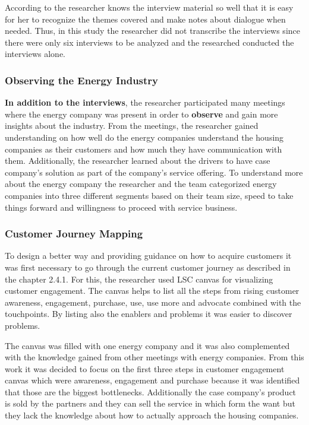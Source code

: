 According to \textcite{HH:2001} the researcher knows the interview material so well that it is easy for her to recognize the themes covered and make notes about dialogue when needed. Thus, in this study the researcher did not transcribe the interviews since there were only six interviews to be analyzed and the researched conducted the interviews alone.

\subsubsection*{Observing the Energy Industry}

\textbf{In addition to the interviews}, the researcher participated many meetings where the energy company was present in order to \textbf{observe} and gain more insights about the industry. From the meetings, the researcher gained understanding on how well do the energy companies understand the housing companies as their customers and how much they have communication with them. Additionally, the researcher learned about the drivers to have case company's solution as part of the company's service offering. To understand more about the energy company the researcher and the team categorized energy companies into three different segments based on their team size, speed to take things forward and willingness to proceed with service business.

\subsubsection*{Customer Journey Mapping}

To design a better way and providing guidance on how to acquire customers it was first necessary to go through the current customer journey as described in the chapter 2.4.1. For this, the researcher used LSC canvas for visualizing customer engagement. The canvas helps to list all the steps from rising customer awareness, engagement, purchase, use, use more and advocate combined with the touchpoints. By listing also the enablers and problems it was easier to discover problems.

The canvas was filled with one energy company and it was also complemented with the knowledge gained from other meetings with energy companies. From this work it was decided to focus on the first three steps in customer engagement canvas which were awareness, engagement and purchase because it was identified that those are the biggest bottlenecks. Additionally the case company's product is sold by the partners and they can sell the service in which form the want but they lack the knowledge about how to actually approach the housing companies.

